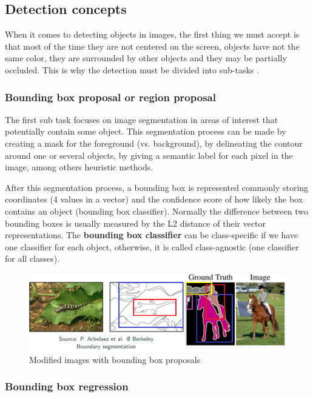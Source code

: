 \documentclass[10pt]{article}
\begin{document}
 
\subsection{Detection concepts}
When it comes to detecting objects in images, the first thing we must accept is that most of the time they are not centered on the screen, objects have not the same color, they are surrounded by other objects and they may be partially occluded. This is why the detection must be divided into sub-tasks \cite{HistoryOfObjectDetetion}. 

\subsubsection{Bounding box proposal or region proposal}
\setlength{\parindent}{0ex}The first sub task focuses on image segmentation in areas of interest that potentially contain some object. This segmentation process can be made by creating a mask for the foreground (vs. background), by delineating the contour around one or several objects, by giving a semantic label for each pixel in the image, among others heuristic methods.
 
After this segmentation process, a bounding box is represented commonly storing coordinates (4 values in a vector) and the confidence score of how likely the box contains an object (bounding box classifier). Normally the difference between two bounding boxes is usually measured by the L2 distance of their vector representations.
The \textbf{bounding box classifier} can be class-specific if we have one classifier for each object, otherwise, it is called class-agnostic  (one classifier for all classes).

\begin{figure}[h]
      	\centering
        \includegraphics[scale=0.9]{Segmentation.PNG}
        \caption{Modified images with bounding box proposals \cite{Long_2015_CVPR}}
\end{figure}

    
    
    \subsubsection{Bounding box regression}
\end{document}
